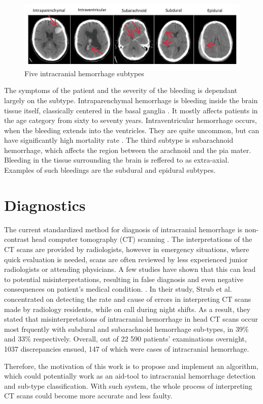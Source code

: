 \begin{figure}[h]
\begin{centering}
\includegraphics[width=14cm]{assets/images/subtypes}
\par\end{centering}
\caption{Five intracranial hemorrhage subtypes \label{fig:subtypes}}
\end{figure}


The symptoms of the patient and the severity of the bleeding is dependant largely on the subtype. Intraparenchymal hemorrhage is bleeding inside the brain tissue itself, classically centered in the basal ganglia \cite{imagingICH}. It mostly affects patients in the age category from sixty to seventy years. Intraventricular hemorrhage occurs, when the bleeding extends into the ventricles. They are quite uncommon, but can have significantly high mortality rate \cite{neuroimagingInTraumaticImageing}. The third subtype is subarachnoid hemorrhage, which affects the region between the arachnoid and the pia mater. Bleeding in the tissue surrounding the brain is reffered to as extra-axial. Examples of such bleedings are the subdural and epidural subtypes.

\section{Diagnostics}
The current standardized method for diagnosis of intracranial hemorrhage is non-contrast head computer tomography (CT) scanning \cite{imagingICH}. The interpretations of the CT scans are provided by radiologists, however in emergency situations, where quick evaluation is needed, scans are often reviewed by less experienced junior radiologists or attending physicians. A few studies have shown that this can lead to potential misinterpretations, resulting in false diagnosis and even negative consequences on patient's medical condition.  \cite{residentEval, overnightCTinterpret}. In their study, Strub et al. \cite{overnightCTinterpret} concentrated on detecting the rate and cause of errors in interpreting CT scans made by radiology residents, while on call during night shifts. As a result, they stated that misinterpretations of intracranial hemorrhage in head CT scans occur most frquently with subdural and subarachnoid hemorrhage sub-types, in 39\% and 33\% respectively. Overall, out of 22 590 patients' examinations overnight, 1037 discrepancies ensued, 147 of which were cases of intracranial hemorrhage.

Therefore, the motivation of this work is to propose and implement an algorithm, which could potentially work as an aid-tool to intracranial hemorrhage detection and sub-type classification. With such system, the whole process of interpreting CT scans could become more accurate and less faulty.